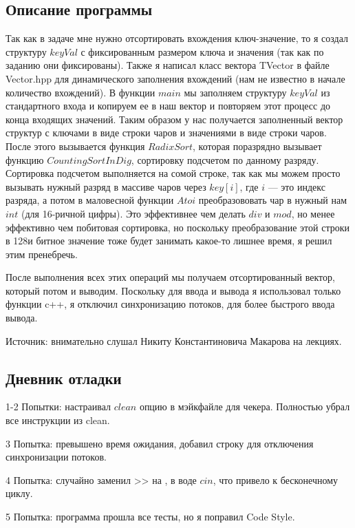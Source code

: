 \documentclass[12pt]{article}
\begin{document}
\subsection*{Описание программы}

Так как в задаче мне нужно отсортировать вхождения ключ-значение, то я создал структуру $keyVal$ с 
фиксированным размером ключа и значения (так как по заданию они фиксированы).  Также я написал класс 
вектора TVector в файле Vector.hpp для динамического заполнения вхождений (нам не известно в начале количество вхождений). 
В функции $main$ мы заполняем структуру $keyVal$ из стандартного входа и копируем ее в наш вектор и повторяем этот процесс 
до конца входящих значений. Таким образом у нас получается заполненный вектор структур с ключами в виде строки чаров и 
значениями в виде строки чаров. После этого вызывается функция $RadixSort$, которая поразрядно вызывает функцию $CountingSortInDig$, 
сортировку подсчетом по данному разряду. Сортировка подсчетом выполняется на сомой строке, так как мы можем просто вызывать нужный 
разряд в массиве чаров через $key[i]$, где $i$ — это индекс разряда, а потом в маловесной функции $Atoi$ преобразововать чар в нужный 
нам $int$ (для 16-ричной цифры). Это эффективнее чем делать $div$ и $mod$, но менее эффективно чем побитовая сортировка, но поскольку 
преобразование этой строки в 128и битное значение тоже будет занимать какое-то лишнее время, я решил этим пренебречь. 

После выполнения всех этих операций мы получаем отсортированный вектор, который потом и выводим. Поскольку для ввода и вывода я использовал 
только функции c++, я отключил синхронизацию потоков, для более быстрого ввода вывода.

Источник: внимательно слушал Никиту Константиновича Макарова на лекциях.

\subsection*{Дневник отладки}

1-2 Попытки: настраивал $clean$ опцию в мэйкфайле для чекера. Полностью убрал все инструкции из clean.

3 Попытка: превышено время ожидания, добавил строку для отключения синхронизации потоков.

4 Попытка: случайно заменил >> на , в воде $cin$, что привело к бесконечному циклу.

5 Попытка: программа прошла все тесты, но я поправил Code Style.
\end{document}
